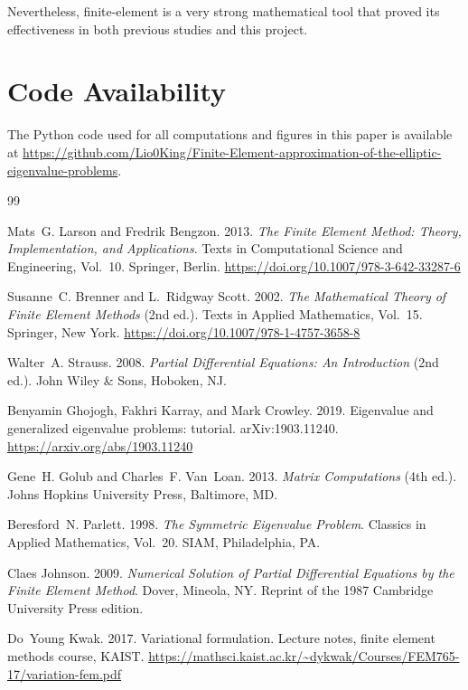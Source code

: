 \documentclass[acmsmall,screen]{MapleTrans}
\begin{document}
Nevertheless, finite-element is a very strong mathematical tool that proved its effectiveness in both previous studies and this project.

\section{Code Availability} \label{sec:code}
The Python code used for all computations and figures in this paper is available at \url{https://github.com/Lio0King/Finite-Element-approximation-of-the-elliptic-eigenvalue-problems}.


\begin{thebibliography}{99}

 Mats~G. Larson and Fredrik Bengzon. 2013. \textit{The Finite Element Method: Theory, Implementation, and Applications}. Texts in Computational Science and Engineering, Vol.~10. Springer, Berlin. \url{https://doi.org/10.1007/978-3-642-33287-6}

 Susanne~C. Brenner and L.~Ridgway Scott. 2002. \textit{The Mathematical Theory of Finite Element Methods} (2nd ed.). Texts in Applied Mathematics, Vol.~15. Springer, New York. \url{https://doi.org/10.1007/978-1-4757-3658-8}

 Walter~A. Strauss. 2008. \textit{Partial Differential Equations: An Introduction} (2nd ed.). John Wiley \& Sons, Hoboken, NJ.

 Benyamin Ghojogh, Fakhri Karray, and Mark Crowley. 2019. Eigenvalue and generalized eigenvalue problems: tutorial. arXiv:1903.11240. \url{https://arxiv.org/abs/1903.11240}

 Gene~H. Golub and Charles~F. Van~Loan. 2013. \textit{Matrix Computations} (4th ed.). Johns Hopkins University Press, Baltimore, MD.

 Beresford~N. Parlett. 1998. \textit{The Symmetric Eigenvalue Problem}. Classics in Applied Mathematics, Vol.~20. SIAM, Philadelphia, PA.

 Claes Johnson. 2009. \textit{Numerical Solution of Partial Differential Equations by the Finite Element Method}. Dover, Mineola, NY. Reprint of the 1987 Cambridge University Press edition.

 Do~Young Kwak. 2017. Variational formulation. Lecture notes, finite element methods course, KAIST. \url{https://mathsci.kaist.ac.kr/~dykwak/Courses/FEM765-17/variation-fem.pdf}


\end{thebibliography}
\end{document}
